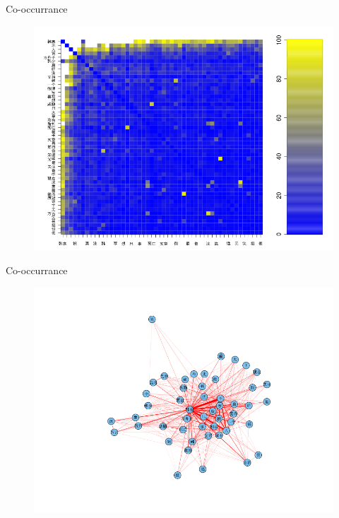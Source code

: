 \documentclass[12pt, trans]{beamer}
\newcommand{\1}[1]{{\mathbf 1}\left\{#1\right\}}        %
\begin{document}
\begin{frame}{Co-occurrance}

\begin{figure}
  \centering
  \includegraphics[height=0.9\textheight]{./../../coocurResults/cooccurMatPlot.png} 
\end{figure}


\end{frame}

\begin{frame}{Co-occurrance}

\begin{figure}
  \centering
  \includegraphics[height=0.9\textheight]{./../../coocurResults/cooccurNetwork.png} 
\end{figure}

\end{frame}
\end{document}
